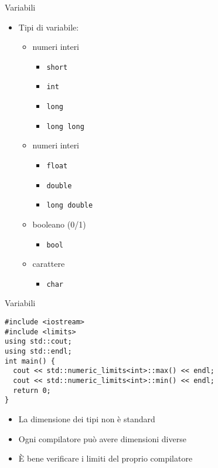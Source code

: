 \documentclass[xcolor=dvipsnames,handout]{beamer}
\begin{document}
\begin{frame}[fragile]{Variabili}
  \vfill
  \begin{itemize}
    \item Tipi di variabile:
    \begin{itemize}
      \item numeri interi
      \begin{itemize}
          \item \lstinline$short$
          \item \lstinline$int$
          \item \lstinline$long$
          \item \lstinline$long long$
      \end{itemize}
        \item numeri interi
        \begin{itemize}
            \item \lstinline$float$
            \item \lstinline$double$
            \item \lstinline$long double$
        \end{itemize}
      \item booleano (0/1)
      \begin{itemize}
        \item \lstinline$bool$
      \end{itemize}
      \item carattere
      \begin{itemize}
        \item \lstinline$char$
      \end{itemize}
    \end{itemize}
  \end{itemize}
  \vfill
\end{frame}

\begin{frame}[fragile]{Variabili}
  \vfill
  \begin{lstlisting}
#include <iostream>
#include <limits>
using std::cout;
using std::endl;
int main() {
  cout << std::numeric_limits<int>::max() << endl;
  cout << std::numeric_limits<int>::min() << endl;
  return 0;
}
  \end{lstlisting}
  \vfill
  \begin{itemize}
    \item La dimensione dei tipi non è standard
    \vfill
    \item Ogni compilatore può avere dimensioni diverse
    \vfill
    \item È bene verificare i limiti del proprio compilatore
  \end{itemize}
  \vfill
\end{frame}
\end{document}
